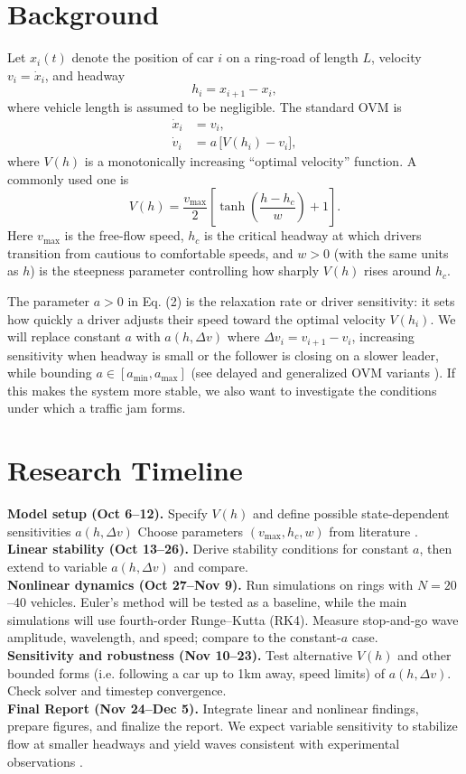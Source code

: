\documentclass[12pt]{article}
\begin{document}
\section{Background}
Let \(x_i(t)\) denote the position of car \(i\) on a ring-road of length \(L\), velocity \(v_i=\dot x_i\), and headway
\[
h_i = x_{i+1} - x_i ,
\]
where vehicle length is assumed to be negligible. The standard OVM \cite{Bando1995PRE} is
\begin{align}
\dot x_i &= v_i, \\
\dot v_i &= a\,\big[V(h_i) - v_i\big],
\end{align}
where \(V(h)\) is a monotonically increasing ``optimal velocity'' function. A commonly used one is \cite{TreiberKesting2013}
\[
V(h) = \frac{v_{\max}}{2}\left[\tanh\!\left(\frac{h-h_c}{w}\right)+1\right].
\]
Here \(v_{\max}\) is the free-flow speed, \(h_c\) is the critical headway at which drivers transition from cautious to comfortable speeds, and \(w>0\) (with the same units as \(h\)) is the steepness parameter controlling how sharply \(V(h)\) rises around \(h_c\). 

The parameter \(a>0\) in  Eq. (2) is the relaxation rate or driver sensitivity: it sets how quickly a driver adjusts their speed toward the optimal velocity \(V(h_i)\). We will replace constant \(a\) with \(a(h,\Delta v)\) where \(\Delta v_i=v_{i+1}-v_i\), increasing sensitivity when headway is small or the follower is closing on a slower leader, while bounding \(a\in[a_{\min},a_{\max}]\) (see delayed and generalized OVM variants \cite{HasebeBando1998Delay,NonlinearDynamics2022Modes}). If this makes the system more stable, we also want to investigate the conditions under which a traffic jam forms. 

\section{Research Timeline}
\textbf{Model setup (Oct 6--12).} Specify $V(h)$ and define possible state-dependent sensitivities $a(h,\Delta v)$  Choose parameters $(v_{\max},h_c,w)$ from literature \cite{Bando1995PRE,TreiberKesting2013}.\\
\noindent \textbf{Linear stability (Oct 13--26).} Derive stability conditions for constant $a$, then extend to variable $a(h,\Delta v)$ and compare. \\
\noindent \textbf{Nonlinear dynamics (Oct 27--Nov 9).} Run simulations on rings with $N=20$--40 vehicles. Euler’s method will be tested as a baseline, while the main simulations will use fourth-order Runge--Kutta (RK4). Measure stop-and-go wave amplitude, wavelength, and speed; compare to the constant-$a$ case. \\
\noindent \textbf{Sensitivity and robustness (Nov 10--23).} Test alternative $V(h)$ and other bounded forms (i.e. following a car up to 1km away, speed limits) of $a(h,\Delta v)$. Check solver and timestep convergence. \\
\noindent \textbf{Final Report (Nov 24--Dec 5).} Integrate linear and nonlinear findings, prepare figures, and finalize the report. We expect variable sensitivity to stabilize flow at smaller headways and yield waves consistent with experimental observations \cite{Sugiyama2008NJP}.
\end{document}
